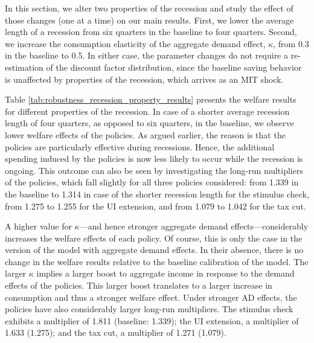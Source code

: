 \documentclass[../HAFiscal]{subfiles}
\begin{document}
In this section, we alter two properties of the recession and study the effect of those changes (one at a time) on our main results. First, we lower the average length of a recession from six quarters in the baseline to four quarters. Second, we increase the consumption elasticity of the aggregate demand effect, $\kappa$, from 0.3 in the baseline to 0.5. In either case, the parameter changes do not require a re-estimation of the discount factor distribution, since the baseline saving behavior is unaffected by properties of the recession, which arrives as an MIT shock. 

Table \ref{tab:robustness_recession_property_results} presents the welfare results for different properties of the recession. In case of a shorter average recession length of four quarters, as opposed to six quarters, in the baseline, we observe lower welfare effects of the policies. As argued earlier, the reason is that the policies are particularly effective during recessions. Hence, the additional spending induced by the policies is now less likely to occur while the recession is ongoing. This outcome can also be seen by investigating the long-run multipliers of the policies, which fall slightly for all three policies considered: from 1.339 in the baseline to 1.314 in case of the shorter recession length for the stimulus check, from 1.275 to 1.255 for the UI extension, and from 1.079 to 1.042 for the tax cut.

A higher value for $\kappa$---and hence stronger aggregate demand effects---considerably increases the welfare effects of each policy. Of course, this is only the case in the version of the model with aggregate demand effects. In their absence, there is no change in the welfare results relative to the baseline calibration of the model. The larger $\kappa$ implies a larger boost to aggregate income in response to the demand effects of the policies. This larger boost translates to a larger increase in consumption and thus a stronger welfare effect. Under stronger AD effects, the policies have also considerably larger long-run multipliers. The stimulus check exhibits a multiplier of 1.811 (baseline: 1.339); the UI extension, a multiplier of 1.633 (1.275); and the tax cut, a multiplier of 1.271 (1.079).
\end{document}
